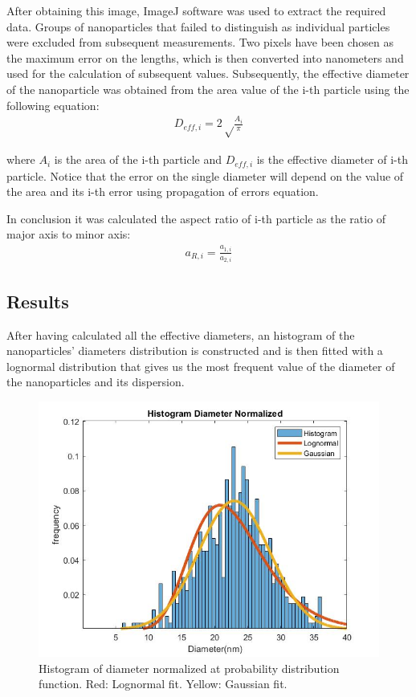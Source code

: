 \documentclass[twocolumn]{article}
\begin{document}
\begin{multicols}{2}
After obtaining this image, ImageJ software was used to extract the required data. Groups of nanoparticles that failed to distinguish as individual particles were excluded from subsequent measurements. Two pixels have been chosen as the maximum error on the lengths, which is then converted into nanometers and used for the calculation of subsequent values.
Subsequently, the effective diameter of the nanoparticle was obtained from the area value of the i-th particle using the following equation:
\begin{align*}
D_{eff,i}=2\sqrt\frac{A_{i}}{\pi}
\end{align*}

where $A_i$ is the area of the i-th particle and $D_{eff,i}$ is the effective diameter of i-th particle. Notice that the error on the single diameter will depend on the value of the area and its i-th error using propagation of errors equation.

In conclusion it was calculated the aspect ratio of i-th particle as the ratio of major axis to minor axis:
\begin{align*}
a_{R,i}=\frac{a_{1,i}}{a_{2,i}}
\end{align*}

\subsection{Results}
After having calculated all the effective diameters, an histogram of the nanoparticles' diameters distribution is constructed and is then fitted with a lognormal distribution that gives us the most frequent value of the diameter of the nanoparticles and its dispersion.

\begin{figure}[H]
    \centering
    \includegraphics[width=\linewidth]{image/data/fitlognorm_correct.jpg}
    \caption{Histogram of diameter normalized at probability distribution function. Red: Lognormal fit. Yellow: Gaussian fit.}
    \label{fig:diameter_distribution}
\end{figure}


\end{multicols}
\end{document}
